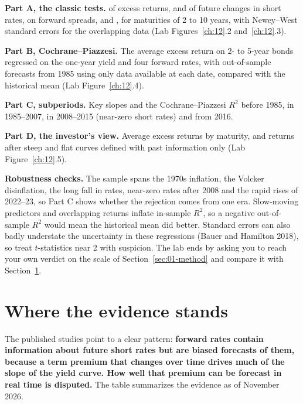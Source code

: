 \textbf{Part A, the classic tests.}  of excess returns, and of future changes in short rates, on forward spreads, and , for maturities of 2 to 10 years, with Newey--West standard errors for the overlapping data (Lab Figures~\ref{ch:12}.2 and~\ref{ch:12}.3).

\textbf{Part B, Cochrane--Piazzesi.} The average excess return on 2- to 5-year bonds regressed on the one-year yield and four forward rates, with out-of-sample forecasts from 1985 using only data available at each date, compared with the historical mean (Lab Figure~\ref{ch:12}.4).

\textbf{Part C, subperiods.} Key slopes and the Cochrane--Piazzesi $R^2$ before 1985, in 1985--2007, in 2008--2015 (near-zero short rates) and from 2016.

\textbf{Part D, the investor's view.} Average excess returns by maturity, and returns after steep and flat curves defined with past information only (Lab Figure~\ref{ch:12}.5).

\label{sec:07-stress}
\textbf{Robustness checks.} The sample spans the 1970s inflation, the Volcker disinflation, the long fall in rates, near-zero rates after 2008 and the rapid rises of 2022--23, so Part C shows whether the rejection comes from one era. Slow-moving predictors and overlapping returns inflate in-sample $R^2$, so a negative out-of-sample $R^2$ would mean the historical mean did better. Standard errors can also badly understate the uncertainty in these regressions (Bauer and Hamilton 2018), so treat $t$-statistics near 2 with suspicion. The lab ends by asking you to reach your own verdict on the scale of Section~\ref{sec:01-method} and compare it with Section~\ref{sec:07-verdict}.

\section{Where the evidence stands}
\label{sec:07-verdict}

The published studies point to a clear pattern: \textbf{forward rates contain information about future short rates but are biased forecasts of them, because a term premium that changes over time drives much of the slope of the yield curve. How well that premium can be forecast in real time is disputed.} The table summarizes the evidence as of November 2026.

